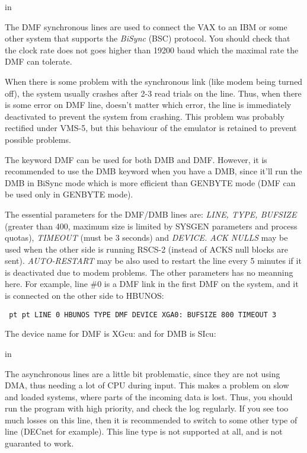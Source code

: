  in

The  DMF  synchronous  lines are used to connect the VAX to an IBM or
some other system that supports the {\sl BiSync} (BSC)  protocol.  You  should
check that the clock rate does not goes higher than 19200 baud which the
maximal rate the DMF can tolerate.

When there is some problem with  the  synchronous  link  (like  modem
being  turned  off), the system usually crashes after 2-3 read trials on
the line. Thus, when there is some error on  DMF  line,  doesn't  matter
which  error,  the line is immediately deactivated to prevent the system
from crashing. This problem was probably rectified under VMS-5, but this
behaviour of the emulator is retained to prevent possible problems.

The  keyword  DMF  can  be  used for both DMB and DMF. However, it is
recommended to use the DMB keyword when you have a DMB, since it'll  run
the  DMB  in  BiSync mode which is more efficient than GENBYTE mode (DMF
can be used only in GENBYTE mode).

The essential parameters for  the  DMF/DMB  lines  are:  {\sl LINE,  TYPE,
BUFSIZE}  (greater than 400, maximum size is limited by SYSGEN parameters
and process quotas), {\sl TIMEOUT} (must be 3 seconds) and
{\sl DEVICE. ACK NULLS}  may
be  used  when  the  other  side is running RSCS-2 (instead of ACKS null
blocks are sent). {\sl AUTO-RESTART} may be also  used  to  restart  the  line
every  5  minutes  if it is deactivated due to modem problems. The other
parameters has no meanning here. For example, line \#0 is a DMF  link  in
the  first  DMF  on the system, and it is connected on the other side to
HBUNOS:

{\obeylines\obeyspaces\tt{} pt  pt
LINE  0  HBUNOS
TYPE  DMF
DEVICE  XGA0:
BUFSIZE  800
TIMEOUT 3
}

The device name for DMF is XGcu: and for DMB is SIcu:

 in

The asynchronous lines are a little bit problematic, since  they  are
not  using  DMA,  thus  needing  a lot of CPU during input. This makes a
problem on slow and loaded systems, where parts of the incoming data  is
lost. Thus, you should run the program with high priority, and check the
log regularly. If you see too much losses  on  this  line,  then  it  is
recommended to switch to some other type of line (DECnet for example).
This  line  type  is  not  supported  at all, and is not guaranted to
work.

